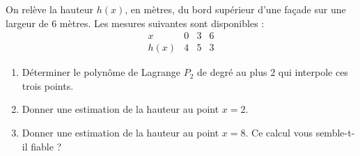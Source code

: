 On relève la hauteur $h(x)$, en mètres,
du bord supérieur d'une façade sur une largeur de $6$ mètres.
Les mesures suivantes sont disponibles :
\[
\begin{array}{c|ccc}
  x      & 0 & 3 & 6 \\
  \hline
  h(x)   & 4 & 5 & 3
\end{array}
\]

\begin{enumerate}
\item Déterminer le polynôme de Lagrange $P_2$
      de degré au plus $2$ qui interpole ces trois points.


\item Donner une estimation de la hauteur au point $x=2$.


\item Donner une estimation de la hauteur au point $x=8$.
      Ce calcul vous semble-t-il fiable ?

\end{enumerate}

\newpage

